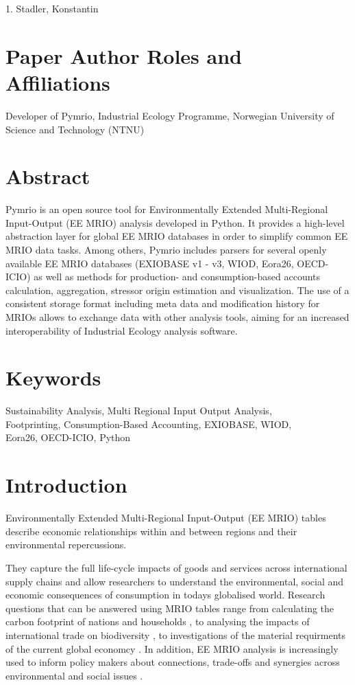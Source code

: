 \documentclass{jors}
\begin{document}
{1. Stadler, Konstantin

\section*{Paper Author Roles and Affiliations}
Developer of Pymrio, Industrial Ecology Programme, Norwegian University of Science and Technology (NTNU)

\section*{Abstract}

Pymrio is an open source tool for Environmentally Extended Multi-Regional Input-Output (EE MRIO) analysis developed in Python.
It provides a high-level abstraction layer for global EE MRIO databases in order to simplify common EE MRIO data tasks. 
Among others, Pymrio includes parsers for several openly available EE MRIO databases (EXIOBASE v1 - v3, WIOD, Eora26, OECD-ICIO) as well as methods for production- and consumption-based accounts calculation, aggregation, stressor origin estimation and visualization. 
The use of a consistent storage format including meta data and modification history for MRIOs allows to exchange data with other analysis tools, aiming for an increased interoperability of Industrial Ecology analysis software.

\section*{Keywords}

Sustainability Analysis, Multi Regional Input Output Analysis, \\ Footprinting, Consumption-Based Accounting, EXIOBASE, WIOD, \\ Eora26, OECD-ICIO, Python

\section*{Introduction}

Environmentally Extended Multi-Regional Input-Output (EE MRIO) tables describe economic relationships within and between regions and their environmental repercussions.

They capture the full life-cycle impacts of goods and services across international supply chains and allow researchers to understand the environmental, social and economic consequences of consumption in todays globalised world. 
Research questions that can be answered using MRIO tables range from calculating the carbon footprint of nations \cite{tukker2014_Global, kanemoto2016_Mapping} and households \cite{ivanova2016_Environmental}, to analysing the impacts of international trade on biodiversity \cite{lenzen2012_International, verones2017_Resource, marques2019_Increasing}, to investigations of the material requirments of the current global economcy \cite{wiedmann2013_material}. In addition, EE MRIO analysis is increasingly used to inform policy makers about connections, trade-offs and synergies across environmental and social issues \cite{simas2014_Bad, simas2017_Correlation, vivanco2018_Nexus, wood2020_peak}.

}
\end{document}
